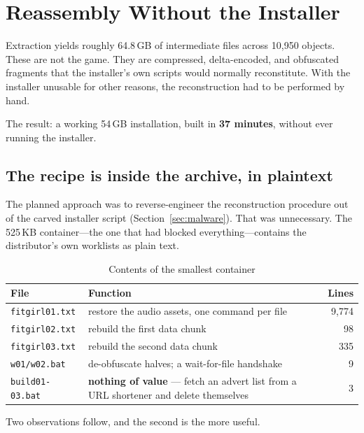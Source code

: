 \section{Reassembly Without the Installer}
\label{sec:reassembly}

Extraction yields roughly 64.8\,GB of intermediate files across 10{,}950 objects.
These are not the game. They are compressed, delta-encoded, and obfuscated
fragments that the installer's own scripts would normally reconstitute. With the
installer unusable for other reasons, the reconstruction had to be performed by
hand.

The result: a working 54\,GB installation, built in \textbf{37 minutes}, without
ever running the installer.

\subsection{The recipe is inside the archive, in plaintext}

The planned approach was to reverse-engineer the reconstruction procedure out of
the carved installer script (Section~\ref{sec:malware}). That was unnecessary.
The 525\,KB container---the one that had blocked everything---contains the
distributor's own worklists as plain text.

\begin{table}[htbp]
\caption{Contents of the smallest container}
\label{tab:fg06}
\centering
\footnotesize
\begin{tabularx}{\columnwidth}{@{}L{2.0cm}Xr@{}}
\toprule
\textbf{File} & \textbf{Function} & \textbf{Lines} \\
\midrule
\verb|fitgirl01.txt| & restore the audio assets, one command per file & 9{,}774 \\
\verb|fitgirl02.txt| & rebuild the first data chunk & 98 \\
\verb|fitgirl03.txt| & rebuild the second data chunk & 335 \\
\verb|w01/w02.bat| & de-obfuscate halves; a wait-for-file handshake & 9 \\
\verb|build01-03.bat| & \textbf{nothing of value} --- fetch an advert list from a
                        URL shortener and delete themselves & 3 \\
\bottomrule
\end{tabularx}
\end{table}

Two observations follow, and the second is the more useful.

